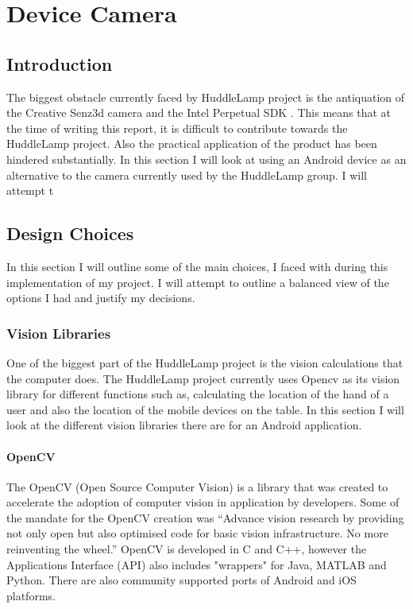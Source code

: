 \chapter{Device Camera}
 
\label{ch:devcamera}
\section{Introduction}
 
The biggest obstacle currently faced by HuddleLamp project is the antiquation of the Creative Senz3d camera and the Intel Perpetual SDK
. This means that at the time of writing this report, it is difficult to contribute towards the HuddleLamp project. Also the practical application of the product has been hindered substantially. In this section I will look at using an Android device as an alternative to the camera currently used by the HuddleLamp group. I will attempt t
 
 
\section{Design Choices} \label{design_choice_android_camera}
In this section I will outline some of the main choices, I faced with during this implementation of my project. I will attempt to outline a balanced view of the options I had and justify my decisions.
 
\subsection{Vision Libraries}
One of the biggest part of the HuddleLamp project is the vision calculations that the computer does. The HuddleLamp project currently uses Opencv as its vision library for different functions such as, calculating the location of the hand of a user and also the location of the mobile devices on the table. In this section I will look at the different vision libraries there are for an Android application.
 
\subsubsection{OpenCV}
The OpenCV (Open Source Computer Vision) is a library that was created to accelerate the adoption of computer vision in application by developers. Some of the mandate for the OpenCV creation was “Advance vision research by providing not only open but also optimised code for basic vision infrastructure. No more reinventing the wheel.”
\cite{opencv_wiki} 
OpenCV is developed in C and C++, however the Applications Interface (API) also includes "wrappers" for Java, MATLAB and Python. There are also community supported ports of Android and iOS platforms.

